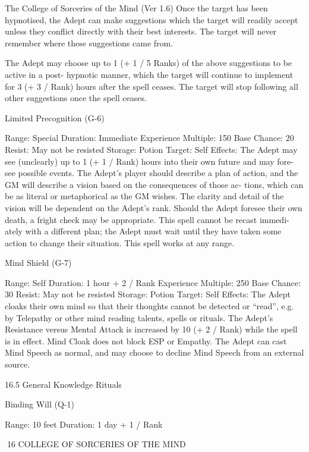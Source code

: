 \begin{Chapter}{The College of Sorceries of the Mind (Ver 1.6)}
Once the target has been hypnotised, the Adept can 
make  suggestions  which  the  target  will  readily 
accept  unless  they  conflict  directly  with  their  best 
interests.  The  target  will  never  remember  where 
these suggestions came from. 

The  Adept  may  choose  up to  1  (+  1 / 5 Ranks)  of 
the  above  suggestions  to  be  active  in  a  post-
hypnotic manner, which the target will continue to 
implement  for  3  (+ 3  / Rank)  hours after  the  spell 
ceases.  The  target  will  stop  following  all  other 
suggestions once the spell ceases. 

Limited Precognition (G-6) 

Range: Special 
Duration: Immediate 
Experience Multiple: 150 
Base Chance: 20%
Resist: May not be resisted 
Storage: Potion 
Target: Self 
Effects: The Adept may see (unclearly) up to 1 (+ 1 
/  Rank)  hours into  their  own  future  and  may  fore-
see  possible  events.  The  Adept’s  player  should 
describe a plan of action, and the GM will describe 
a  vision  based  on  the  consequences  of  those  ac-
tions, which can be as literal or metaphorical as the 
GM wishes. The clarity and detail of the vision will 
be  dependent  on  the  Adept’s  rank.  Should  the 
Adept foresee their own death, a fright check may 
be appropriate. This spell cannot be recast immedi-
ately  with  a  different  plan;  the  Adept  must  wait 
until  they  have  taken  some  action  to  change  their 
situation. This spell works at any range. 

Mind Shield (G-7) 

Range: Self 
Duration: 1 hour + 2 / Rank 
Experience Multiple: 250 
Base Chance: 30%
Resist: May not be resisted 
Storage: Potion 
Target: Self 
Effects:  The  Adept  cloaks  their  own  mind  so  that 
their thoughts cannot be detected or “read”, e.g. by 
Telepathy  or  other  mind  reading  talents,  spells  or 
rituals.  The  Adept’s  Resistance  versus  Mental 
Attack  is  increased  by  10  (+  2  /  Rank)  while  the 
spell  is  in  effect.  Mind  Cloak  does  not  block  ESP 
or  Empathy.  The  Adept  can  cast  Mind  Speech  as 
normal,  and  may  choose  to  decline  Mind  Speech 
from an external source. 

16.5 General Knowledge Rituals 

Binding Will (Q-1) 

Range: 10 feet 
Duration: 1 day + 1 / Rank 

16 COLLEGE OF SORCERIES OF THE MIND 


\end{Chapter}
